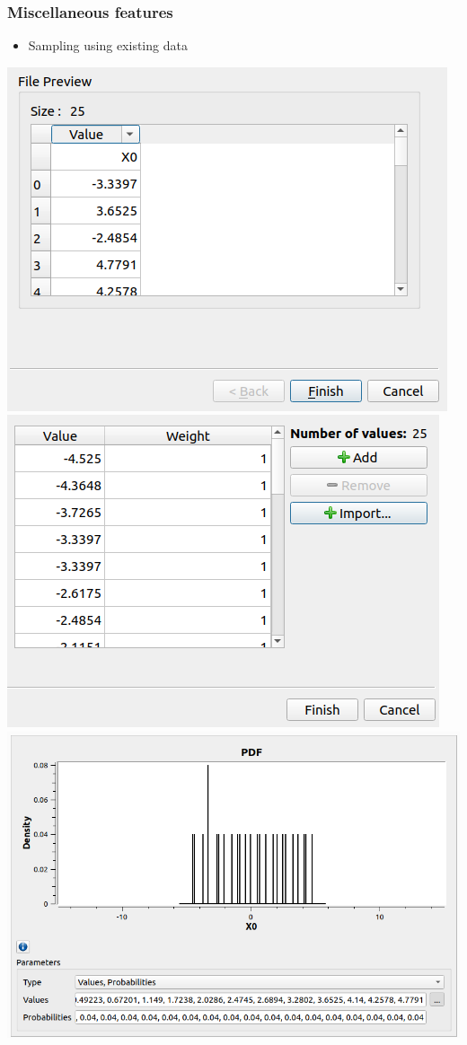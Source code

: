 \documentclass[aspectratio=169]{beamer}
\begin{document}

\begin{frame}
  \frametitle{Miscellaneous features}
   \begin{itemize}
   \item Sampling using existing data
   \end{itemize}
   \begin{center}
     \includegraphics[height=0.3\textheight]{figures/userDef1.png} \includegraphics[height=0.3\textheight]{figures/userDef2.png} \includegraphics[height=0.3\textheight]{figures/userDef3.png}

\end{center}
\end{frame}
\end{document}
